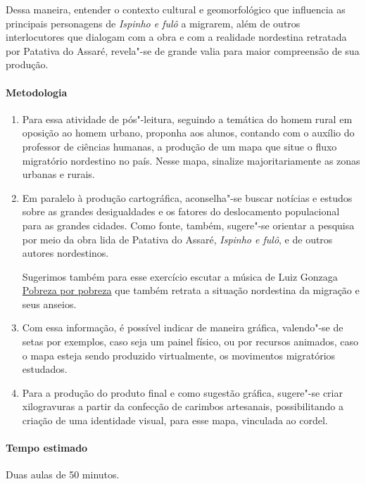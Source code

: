 \documentclass[12pt]{extarticle}
\begin{document}
Dessa maneira, entender o contexto cultural e geomorfológico que influencia 
as principais personagens de \emph{Ispinho e fulô} a migrarem, além de 
outros interlocutores que dialogam com a obra e com a realidade nordestina 
retratada por Patativa do Assaré, revela"-se de grande valia para maior 
compreensão de sua produção.

\paragraph{Metodologia}

\begin{enumerate}
\item
Para essa atividade de pós"-leitura, seguindo a temática do homem rural 
em oposição ao homem urbano, proponha aos alunos, contando com o auxílio 
do professor de ciências humanas, a produção de um mapa que situe o fluxo 
migratório nordestino no país. Nesse mapa, sinalize majoritariamente as 
zonas urbanas e rurais. 

\item
Em paralelo à produção cartográfica, aconselha"-se buscar notícias e 
estudos sobre as grandes desigualdades e os fatores do deslocamento 
populacional para as grandes cidades. Como fonte, também, sugere"-se 
orientar a pesquisa por meio da obra lida de Patativa do Assaré, 
\emph{Ispinho e fulô}, e de outros autores nordestinos.

Sugerimos também para esse exercício escutar a música de Luiz Gonzaga \href{https://www.youtube.com/watch?v=L9WSaMi2QhA&ab_channel=LuizGonzaga-Topic}{Pobreza por pobreza} que também retrata a situação nordestina da migração e seus 
anseios. 

\item
Com essa informação, é possível indicar de maneira gráfica, valendo"-se 
de setas por exemplos,
caso seja um painel físico, ou por recursos animados, caso o mapa esteja
sendo produzido virtualmente, os movimentos migratórios estudados. 

\item
Para a produção do produto final e como sugestão gráfica, sugere"-se criar xilogravuras a partir da confecção de carimbos artesanais, possibilitando 
a criação de uma identidade visual, para esse mapa, vinculada ao cordel.

\end{enumerate}

\paragraph{Tempo estimado} Duas aulas de 50 minutos. 
\end{document}
